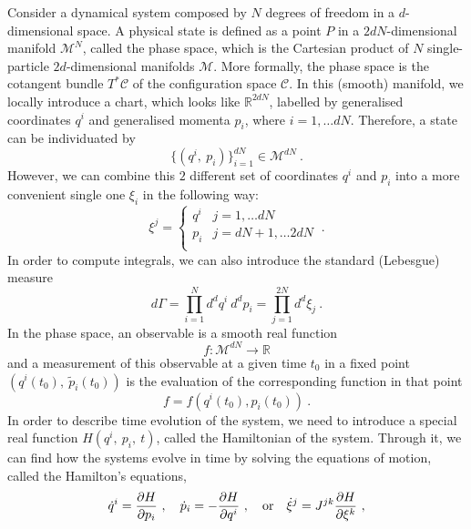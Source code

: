     Consider a dynamical system composed by $N$ degrees of freedom in a $d$-dimensional space. A physical state is defined as a point $P$ in a $2dN$-dimensional manifold $\mathcal M^N$, called the phase space, which is the Cartesian product of $N$ single-particle $2d$-dimensional manifolds $\mathcal M$. More formally, the phase space is the cotangent bundle $T^*\mathcal C$ of the configuration space $\mathcal C$. In this (smooth) manifold, we locally introduce a chart, which looks like $\mathbb R^{2dN}$, labelled by generalised coordinates $q^i$ and generalised momenta $p_i$, where $i = 1, \ldots dN$. Therefore, a state can be individuated by
    \begin{equation*}
        \{(q^i, ~p_i)\}_{i=1}^{dN} \in \mathcal M^{dN} ~.
    \end{equation*}
    However, we can combine this $2$ different set of coordinates $q^i$ and $p_i$ into a more convenient single one $\xi_i$ in the following way: 
    \begin{equation}\label{cm:symplcoord}
    \xi^j = \begin{cases}
        q^i & j = 1, \ldots dN \\
        p_i & j = dN+1, \ldots 2dN \\
    \end{cases} ~.
    \end{equation}
    In order to compute integrals, we can also introduce the standard (Lebesgue) measure
    \begin{equation}\label{cm:measure}
        d\Gamma = \prod_{i=1}^N d^d q^i ~ d^d p_i = \prod_{j=1}^{2N} d^d \xi_j ~.
    \end{equation}
    In the phase space, an observable is a smooth real function 
    \begin{equation*}
        f \colon \mathcal M^{dN} \rightarrow \mathbb R
    \end{equation*}
    and a measurement of this observable at a given time $t_0$ in a fixed point $(q^i(t_0), ~\tilde p_i(t_0))$ is the evaluation of the corresponding function in that point 
    \begin{equation*}
        f = f(q^i(t_0), p_i(t_0)) ~.
    \end{equation*}
    In order to describe time evolution of the system, we need to introduce a special real function $H(q^i, ~p_i, ~t)$, called the Hamiltonian of the system. Through it, we can find how the systems evolve in time by solving the equations of motion, called the Hamilton's equations,
    \begin{equation}\label{cm:hameq}
        \dot q^i = \frac{\partial H}{\partial p_i} ~, \quad \dot p_i = - \frac{\partial H}{\partial q^i} ~, \quad \text{or} \quad \dot \xi^j = J^{jk} \frac{\partial H}{\partial\xi^k} ~,
    \end{equation}
